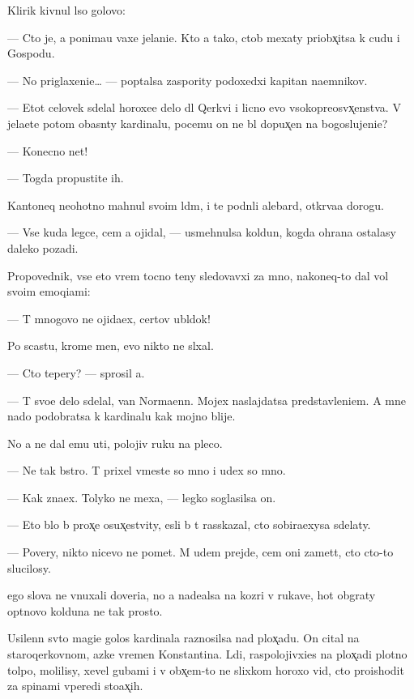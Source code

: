 \documentclass[10pt]{book}
\begin{document}
Klirik kivnul l{\yi}so{\y} golovo{\y}:

— Cto je, {\y}a ponima{\y}u vaxe jelani{\y}e. Kto {\y}a tako{\y}, ctob{\yi} mexaty priobx̨itsa k cudu i Gospodu.

— No priglaxeni{\y}e… — pop{\yi}talsa zaspority podoxedxi{\y} kapitan na{\y}emnikov.

— Etot celovek sdelal horoxe{\y}e delo dl{\ia} Qerkvi i licno {\y}evo v{\yi}sokopreosv{\ia}x̨enstva. V{\yi} jela{\y}ete potom ob{\y}asn{\ia}ty kardinalu, pocemu on ne b{\yi}l dopux̨en na bogoslujeni{\y}e?

— Konecno net!

— Togda propustite ih.

Kantoneq neohotno mahnul svo{\y}im l{\iu}d{\ia}m, i te podn{\ia}li alebard{\yi}, otkr{\yi}va{\y}a dorogu.

— Vse kuda legce, cem {\y}a ojidal, — usmehnulsa koldun, kogda ohrana ostalasy daleko pozadi.

Propovednik, vse eto vrem{\ia} tocno teny sledovavxi{\y} za mno{\y}, nakoneq-to dal vol{\iu} svo{\y}im emoqi{\y}ami:

— T{\yi} mnogovo ne ojida{\y}ex, certov ubl{\iu}dok!

Po scast{\y}u, krome men{\ia}, {\y}evo nikto ne sl{\yi}xal.

— Cto tepery? — sprosil {\y}a.

— T{\yi} svo{\y}e delo sdelal, van Norma{\y}enn. Mojex naslajdatsa predstavleni{\y}em. A mne nado podobratsa k kardinalu kak mojno blije.

No {\y}a ne dal {\y}emu u{\y}ti, polojiv ruku na pleco.

— Ne tak b{\yi}stro. T{\yi} prixel vmeste so mno{\y} i u{\y}dex so mno{\y}.

— Kak zna{\y}ex. Tolyko ne mexa{\y}, — legko soglasilsa on.

— Eto b{\yi}lo b{\yi} prox̨e osux̨estvity, {\y}esli b{\yi} t{\yi} rasskazal, cto sobira{\y}exysa sdelaty.

— Povery, nikto nicevo ne po{\y}met. M{\yi} u{\y}dem prejde, cem oni zamet{\ia}t, cto cto-to slucilosy.

{\Y}ego slova ne vnuxali doveri{\y}a, no {\y}a nade{\y}alsa na koz{\yi}ri v rukave, hot{\ia} ob{\yi}graty op{\yi}tnovo kolduna ne tak prosto.

Usilenn{\yi}{\y} sv{\ia}to{\y} magi{\y}e{\y} golos kardinala raznosilsa nad plox̨ad{\y}u. On cital na staroqerkovnom, {\y}az{\yi}ke vremen Konstantina. L{\iu}di, raspolojivxi{\y}es{\ia} na plox̨adi plotno{\y} tolpo{\y}, molilisy, xevel{\ia} gubami i v obx̨em-to ne slixkom horoxo vid{\ia}, cto pro{\y}ishodit za spinami vperedi sto{\y}ax̨ih.
\end{document}
